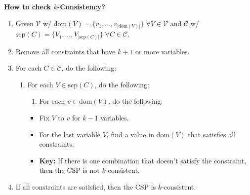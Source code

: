 \begin{process} \textbf{How to check $k$-Consistency?} 
    \begin{enumerate}
        \item Given $\mathcal{V}$ w/ $\text{dom}(V) = \{v_1,\ldots,v_{|\text{dom}(V)|}\} \; \forall V \in \mathcal{V}$ and $\mathcal{C}$ w/ $\text{scp}(C) = \{V_1,\ldots,V_{|\text{scp}(C)|}\} \; \forall C \in \mathcal{C}$.
        \item Remove all constraints that have $k+1$ or more variables.
        \item For each $C \in \mathcal{C}$, do the following:
        \begin{enumerate}
            \item For each $V \in \text{scp}(C)$, do the following:
            \begin{enumerate}
                \item For each $v \in \text{dom}(V)$, do the following:
            \end{enumerate}
            \begin{itemize}
                \item Fix $V$ to $v$ for $k-1$ variables.
                \item For the last variable $V$, find a value in $\text{dom}(V)$ that satisfies all constraints.
                \item \textbf{Key:} If there is one combination that doesn't satisfy the constraint, then the CSP is not $k$-consistent.
            \end{itemize}
        \end{enumerate}
        \item If all constraints are satisfied, then the CSP is $k$-consistent.
    \end{enumerate}
\end{process}

